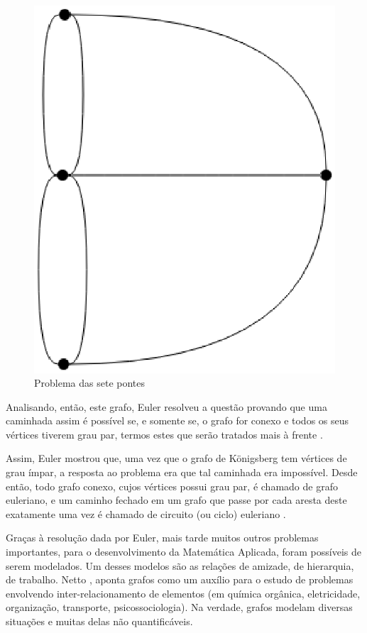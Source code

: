 \begin{figure}[!h]
	\centering
	\includegraphics[scale=0.25]{figuras/capitulo2/sete_pontes.eps}
	\caption{Problema das sete pontes}
	\label{sete_pontes}
\end{figure}

Analisando, então, este grafo, Euler resolveu a questão provando que uma caminhada assim é possível se, e somente se, o grafo for conexo e todos os seus vértices tiverem grau par, termos estes que serão tratados mais à frente \cite{Malta:2008}.

Assim, Euler mostrou que, uma vez que o grafo de Königsberg tem vértices de grau ímpar, a resposta ao problema era que tal caminhada era impossível. Desde então, todo grafo conexo, cujos vértices possui grau par, é chamado de grafo euleriano, e um caminho fechado em um grafo que passe por cada aresta deste exatamente uma vez é chamado de circuito (ou ciclo) euleriano \cite{Malta:2008}.

Graças à resolução dada por Euler, mais tarde muitos outros problemas importantes, para o desenvolvimento da Matemática Aplicada, foram possíveis de serem modelados. Um desses modelos são as relações de amizade, de hierarquia, de trabalho. Netto \cite{Netto:2012}, aponta grafos como um auxílio para o estudo de problemas envolvendo inter-relacionamento de elementos (em química orgânica, eletricidade, organização, transporte, psicossociologia). Na verdade, grafos modelam diversas situações e muitas delas não quantificáveis.

